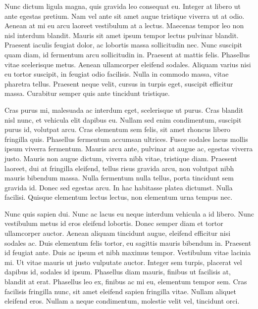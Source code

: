 \documentclass{article}
\begin{document}
Nunc dictum ligula magna, quis gravida leo consequat eu. Integer at libero ut ante egestas pretium. Nam vel ante sit amet augue tristique viverra ut at odio. Aenean at mi eu arcu laoreet vestibulum at a lectus. Maecenas tempor leo non nisl interdum blandit. Mauris sit amet ipsum tempor lectus pulvinar blandit. Praesent iaculis feugiat dolor, ac lobortis massa sollicitudin nec. Nunc suscipit quam diam, id fermentum arcu sollicitudin in. Praesent at mattis felis. Phasellus vitae scelerisque metus. Aenean ullamcorper eleifend sodales. Aliquam varius nisi eu tortor suscipit, in feugiat odio facilisis. Nulla in commodo massa, vitae pharetra tellus. Praesent neque velit, cursus in turpis eget, suscipit efficitur massa. Curabitur semper quis ante tincidunt tristique.


Cras purus mi, malesuada ac interdum eget, scelerisque ut purus. Cras blandit nisl nunc, et vehicula elit dapibus eu. Nullam sed enim condimentum, suscipit purus id, volutpat arcu. Cras elementum sem felis, sit amet rhoncus libero fringilla quis. Phasellus fermentum accumsan ultrices. Fusce sodales lacus mollis ipsum viverra fermentum. Mauris arcu ante, pulvinar at augue ac, egestas viverra justo. Mauris non augue dictum, viverra nibh vitae, tristique diam. Praesent laoreet, dui at fringilla eleifend, tellus risus gravida arcu, non volutpat nibh mauris bibendum massa. Nulla fermentum nulla tellus, porta tincidunt sem gravida id. Donec sed egestas arcu. In hac habitasse platea dictumst. Nulla facilisi. Quisque elementum lectus lectus, non elementum urna tempus nec.


Nunc quis sapien dui. Nunc ac lacus eu neque interdum vehicula a id libero. Nunc vestibulum metus id eros eleifend lobortis. Donec semper diam et tortor ullamcorper auctor. Aenean aliquam tincidunt augue, eleifend efficitur nisi sodales ac. Duis elementum felis tortor, eu sagittis mauris bibendum in. Praesent id feugiat ante. Duis ac ipsum et nibh maximus tempor. Vestibulum vitae lacinia mi. Ut vitae mauris ut justo vulputate auctor. Integer sem turpis, placerat vel dapibus id, sodales id ipsum. Phasellus diam mauris, finibus ut facilisis at, blandit at erat. Phasellus leo ex, finibus ac mi eu, elementum tempor sem. Cras facilisis fringilla nunc, sit amet eleifend sapien fringilla vitae. Nullam aliquet eleifend eros. Nullam a neque condimentum, molestie velit vel, tincidunt orci.
\end{document}

